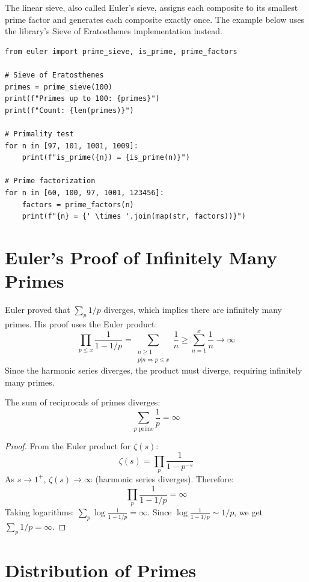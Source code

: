 The linear sieve, also called Euler's sieve, assigns each composite to its smallest
prime factor and generates each composite exactly once. The example below uses the
library's Sieve of Eratosthenes implementation instead.

\begin{lstlisting}[caption={Prime sieves}, label=lst:prime_sieve]
from euler import prime_sieve, is_prime, prime_factors

# Sieve of Eratosthenes
primes = prime_sieve(100)
print(f"Primes up to 100: {primes}")
print(f"Count: {len(primes)}")

# Primality test
for n in [97, 101, 1001, 1009]:
    print(f"is_prime({n}) = {is_prime(n)}")

# Prime factorization
for n in [60, 100, 97, 1001, 123456]:
    factors = prime_factors(n)
    print(f"{n} = {' \times '.join(map(str, factors))}")
\end{lstlisting}

\section{Euler's Proof of Infinitely Many Primes}

Euler proved that $\sum_p 1/p$ diverges, which implies there are infinitely many primes.
His proof uses the Euler product:
\[
\prod_{p \le x} \frac{1}{1 - 1/p} = \sum_{\substack{n \ge 1 \\ p|n \Rightarrow p \le x}} \frac{1}{n} \ge \sum_{n=1}^x \frac{1}{n} \to \infty
\]
Since the harmonic series diverges, the product must diverge, requiring infinitely many primes.

\begin{theorem}[Euler, 1737]
The sum of reciprocals of primes diverges:
\[
\sum_{p \text{ prime}} \frac{1}{p} = \infty
\]
\end{theorem}

\begin{proof}
From the Euler product for $\zeta(s)$:
\[
\zeta(s) = \prod_p \frac{1}{1 - p^{-s}}
\]
As $s \to 1^+$, $\zeta(s) \to \infty$ (harmonic series diverges). Therefore:
\[
\prod_p \frac{1}{1 - 1/p} = \infty
\]
Taking logarithms: $\sum_p \log\frac{1}{1-1/p} = \infty$. Since $\log\frac{1}{1-1/p} \sim 1/p$, we get $ \sum_p 1/p = \infty$.
\end{proof}

\section{Distribution of Primes}


